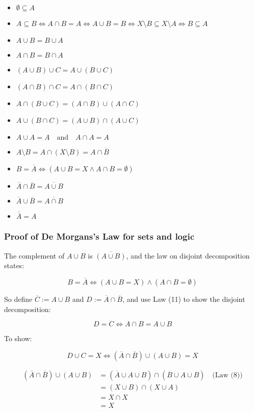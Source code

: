 \begin{itemize}
	\item \(\emptyset \subseteq A\)
	\item \(A \subseteq B \iff A \cap B = A \iff A \cup B = B \iff X \setminus B \subseteq X \setminus A \iff B \subseteq A\)
	\item \(A \cup B = B \cup A\) 
	\item \(A \cap B = B \cap A\) 
	\item \((A \cup B) \cup C = A \cup (B \cup C)\) 
	\item \((A \cap B) \cap C = A \cap (B \cap C)\) 
	\item \(A \cap (B \cup C) = (A \cap B) \cup (A \cap C)\) 
	\item \(A \cup (B \cap C) = (A \cup B) \cap (A \cup C)\) 
	\item \(A \cup A = A \quad \text{and} \quad A \cap A = A\)
	\item \(A \setminus B = A \cap (X \setminus B) = A \cap \overline{B}\)
	\item \(B = \overline{A} \iff (A \cup B = X \land A \cap B = \emptyset)\) 
	\item \(\overline{A} \cap \overline{B} = \overline{A \cup B}\) 
	\item \(\overline{A} \cup \overline{B} = \overline{A \cap B}\) 
	\item \(\overline{\overline{A}} = A\)
\end{itemize}

\subsubsection{Proof of De Morgans's Law for sets and logic}

The complement of \( A \cup B \) is \( \overline{(A \cup B)} \), and the law on disjoint decomposition states:

\[
	B = \overline{A} \iff (A \cup B = X) \land (A \cap B = \emptyset)
\]

So define \( \overline{C} := A \cup B \) and \( D := \overline{A} \cap \overline{B} \),
and use Law (11) to show the disjoint decomposition:

\[
	D = C \iff A \cap B = A \cup B
\]

To show:

\[
	D \cup C = X \iff (\overline{A} \cap \overline{B}) \cup (A \cup B) = X
\]

\begin{align*}
	(\overline{A} \cap \overline{B}) \cup (A \cup B)
	 & = (\overline{A} \cup A \cup B) \cap (\overline{B} \cup A \cup B) \quad \text{(Law (8))} \\
	 & = (X \cup B) \cap (X \cup A)                                                            \\
	 & = X \cap X                                                                              \\
	 & = X
\end{align*}

